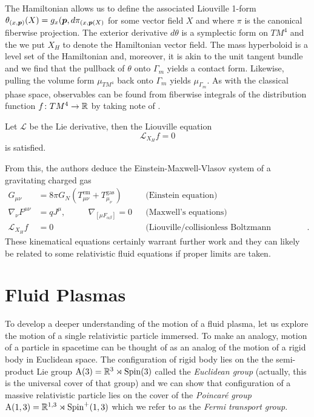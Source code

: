 \documentclass{article}
\begin{document}
The Hamiltonian allows us to define the associated Liouville 1-form $\theta_{(x,\boldsymbol{p})}(X)=g_x(\boldsymbol{p}, d\pi_{(x,\boldsymbol{p}(X)}$ for some vector field $X$ and where $\pi$ is the canonical fiberwise projection. The exterior derivative $d\theta$ is a symplectic form on $TM^4$ and the we put $X_H$ to denote the Hamiltonian vector field. The mass hyperboloid is a level set of the Hamiltonian and, moreover, it is akin to the unit tangent bundle and we find that the pullback of $\theta$ onto $\Gamma_m$ yields a contact form. Likewise, pulling the volume form $\mu_{TM^4}$ back onto $\Gamma_m$ yields $\mu_{\Gamma_m}$. As with the classical phase space, observables can be found from fiberwise integrals of the distribution function $f\colon TM^4\to \mathbb{R}$ by taking note of \cite[Lemma 4, Lemma 5]{sarbach_relativistic_2013}.
\begin{theorem}
Let $\mathcal{L}$ be the Lie derivative, then the Liouville equation 
\begin{equation}
    \mathcal{L}_{X_H} f = 0
\end{equation}
is satisfied.
\end{theorem}
From this, the authors deduce the Einstein-Maxwell-Vlasov system of a gravitating charged gas
\begin{align}
    G_{\mu \nu} &= 8\pi G_N \left(T_{\mu \nu}^{\textrm{em}} + T_{\mu_\nu}^{\textrm{gas}}\right) && \textrm{(Einstein equation)}\\
    \nabla_\nu F^{\mu \nu} &= q J^\mu,\qquad ~~~ \nabla_{[\mu F_{\alpha \beta}]}=0 && \textrm{(Maxwell's equations)}\\
    \mathcal{L}_{X_H}f &=0 &&\textrm{(Liouville/collisionless Boltzmann equation)}.
\end{align}
These kinematical equations certainly warrant further work and they can likely be related to some relativistic fluid equations if proper limits are taken.





\section{Fluid Plasmas}
\label{sec:spinor_equations}

To develop a deeper understanding of the motion of a fluid plasma, let us explore the motion of a single relativistic particle immersed. To make an analogy, motion of a particle in spacetime can be thought of as an analog of the motion of a rigid body in Euclidean space. The configuration of rigid body lies on the the semi-product Lie group $\mathrm{A}(3)=\mathbb{R}^3 \rtimes \operatorname{Spin}(3)$ called the \emph{Euclidean group} (actually, this is the universal cover of that group) and we can show that configuration of a massive relativistic particle lies on the cover of the \emph{Poincar\'e group} $\mathrm{A}(1,3) = \mathbb{R}^{1,3} \rtimes \operatorname{Spin}^+(1,3)$ which we refer to as the \emph{Fermi transport group}.
\end{document}

